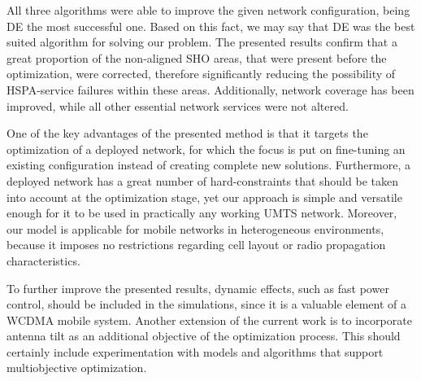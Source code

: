 All three algorithms were able to improve the given network configuration,
being DE the most successful one. Based on this fact, we may say that
DE was the best suited algorithm for solving our problem. The presented
results confirm that a great proportion of the non-aligned SHO areas,
that were present before the optimization, were corrected, therefore
significantly reducing the possibility of HSPA-service failures within
these areas. Additionally, network coverage has been improved, while
all other essential network services were not altered. 

One of the key advantages of the presented method is that it targets
the optimization of a deployed network, for which the focus is put
on fine-tuning an existing configuration instead of creating complete
new solutions. Furthermore, a deployed network has a great number
of hard-constraints that should be taken into account at the optimization
stage, yet our approach is simple and versatile enough for it to be
used in practically any working UMTS network. Moreover, our model
is applicable for mobile networks in heterogeneous environments, because
it imposes no restrictions regarding cell layout or radio propagation
characteristics.

To further improve the presented results, dynamic effects, such as
fast power control, should be included in the simulations, since it
is a valuable element of a WCDMA mobile system. Another extension
of the current work is to incorporate antenna tilt as an additional
objective of the optimization process. This should certainly include
experimentation with models and algorithms that support multiobjective
optimization.
